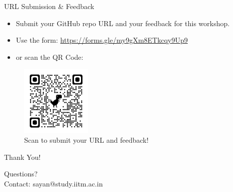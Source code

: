 \documentclass[aspectratio=169]{beamer} %
\begin{document}
\begin{frame}{URL Submission \& Feedback}
  \begin{itemize}
    \item Submit your GitHub repo URL and your feedback for this workshop.
    \item Use the form: \url{https://forms.gle/my9gXm8ETkcqy9Up9}
    \item or scan the QR Code:
  \end{itemize}

  \begin{figure}
    \centering
    \includegraphics[width=0.3\textwidth]{res/feedback.png}
    \caption{Scan to submit your URL and feedback!}
  \end{figure}
\end{frame}

\begin{frame}{Thank You!}
  \begin{center}
    Questions? \\
    Contact: sayan@study.iitm.ac.in
  \end{center}
\end{frame}
\end{document}
